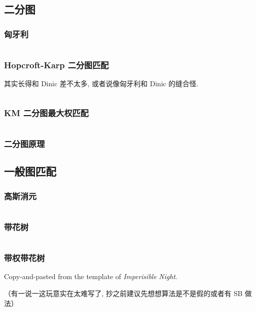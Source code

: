 \documentclass[a4paper, twoside]{article}
\begin{document}
\begin{multicols}{2}
			\subsection{二分图}
				\subsubsection{匈牙利}
					\inputminted{cpp}{../src/graph/hungary.cpp}

				\subsubsection{Hopcroft-Karp 二分图匹配}
					其实长得和 Dinic 差不太多, 或者说像匈牙利和 Dinic 的缝合怪.
					\inputminted{cpp}{../src/graph/hopcroft-karp.cpp}

				\subsubsection{KM 二分图最大权匹配}
					\inputminted{cpp}{../src/graph/KM二分图最大权匹配.cpp}

				\subsubsection{二分图原理}
					
			
			\subsection{一般图匹配}
				\subsubsection{高斯消元}
					\inputminted{cpp}{../src/graph/基于线性代数的一般图匹配.cpp}

				\subsubsection{带花树}
					\inputminted{cpp}{../src/graph/带花树.cpp}
				
				\subsubsection{带权带花树}
					Copy-and-pasted from the template of \textit{Imperisible Night}.

					（有一说一这玩意实在太难写了, 抄之前建议先想想算法是不是假的或者有 SB 做法）
					\inputminted{cpp}{../src/graph/带权带花树.cpp}
				

\end{multicols}
\end{document}
